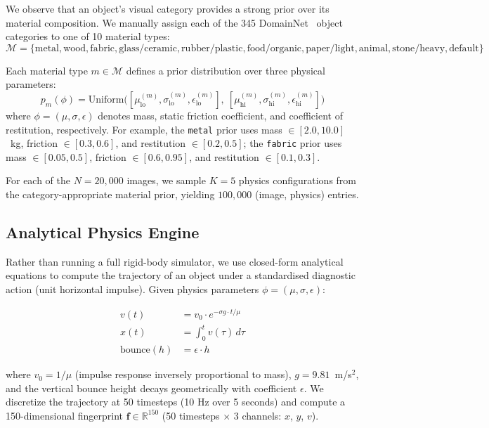 \documentclass{article}
\newcommand{\reals}{\mathbb{R}}
\begin{document}
We observe that an object's visual category provides a strong prior over its material composition. We manually assign each of the 345 DomainNet~\cite{peng2019domainnet} object categories to one of 10 material types:
\begin{equation}
    \mathcal{M} = \{\text{metal}, \text{wood}, \text{fabric}, \text{glass/ceramic}, \text{rubber/plastic}, \text{food/organic}, \text{paper/light}, \text{animal}, \text{stone/heavy}, \text{default}\}
\end{equation}

Each material type $m \in \mathcal{M}$ defines a prior distribution over three physical parameters:
\begin{equation}
    p_m(\phi) = \text{Uniform}\big([\mu_\text{lo}^{(m)}, \sigma_\text{lo}^{(m)}, \epsilon_\text{lo}^{(m)}],\ [\mu_\text{hi}^{(m)}, \sigma_\text{hi}^{(m)}, \epsilon_\text{hi}^{(m)}]\big)
\end{equation}
where $\phi = (\mu, \sigma, \epsilon)$ denotes mass, static friction coefficient, and coefficient of restitution, respectively. For example, the \texttt{metal} prior uses mass $\in [2.0, 10.0]$~kg, friction $\in [0.3, 0.6]$, and restitution $\in [0.2, 0.5]$; the \texttt{fabric} prior uses mass $\in [0.05, 0.5]$, friction $\in [0.6, 0.95]$, and restitution $\in [0.1, 0.3]$.

For each of the $N{=}20{,}000$ images, we sample $K{=}5$ physics configurations from the category-appropriate material prior, yielding $100{,}000$ (image, physics) entries.

\subsection{Analytical Physics Engine}
\label{sec:engine}

Rather than running a full rigid-body simulator, we use closed-form analytical equations to compute the trajectory of an object under a standardised diagnostic action (unit horizontal impulse). Given physics parameters $\phi = (\mu, \sigma, \epsilon)$:

\begin{align}
    v(t) &= v_0 \cdot e^{-\sigma g \cdot t / \mu} \label{eq:velocity} \\
    x(t) &= \int_0^t v(\tau) \, d\tau \label{eq:position} \\
    \text{bounce}(h) &= \epsilon \cdot h \label{eq:bounce}
\end{align}

where $v_0 = 1/\mu$ (impulse response inversely proportional to mass), $g = 9.81$~m/s$^2$, and the vertical bounce height decays geometrically with coefficient $\epsilon$. We discretize the trajectory at 50 timesteps (10 Hz over 5 seconds) and compute a 150-dimensional fingerprint $\mathbf{f} \in \reals^{150}$ (50 timesteps $\times$ 3 channels: $x$, $y$, $v$).
\end{document}
